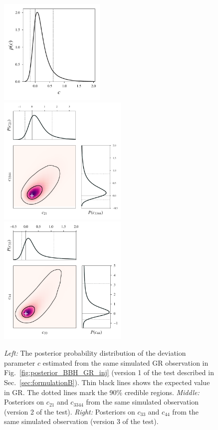 \documentclass[prd,preprintnumbers,twocolumn,eqsecnum,floatfix,a4paper,nofootinbib,superscriptaddress]{revtex4}
\begin{document}
\begin{figure}[tbh]
	\begin{center}
 		\includegraphics[height=2.0in]{figs/hist_c1_M_80_q_9_SNR_25.pdf}
		\includegraphics[height=2.45in]{figs/c2_c34_M_80_q_9_SNR_25.pdf}
		\includegraphics[height=2.45in]{figs/c3_c4_M_80_q_9_SNR_25.pdf}
	\end{center} 
 	\caption{\emph{Left:} The posterior probability distribution of the deviation parameter $c$ estimated from the same simulated GR observation in Fig.~\ref{fig:posterior_BBH_GR_inj} (version 1 of the test described in Sec.~\ref{sec:formulationB}). Thin black lines shows the expected value in GR. The dotted lines mark the 90\% credible regions. \emph{Middle:} Posteriors on $c_{21}$ and $c_{3344}$ from the same simulated observation (version 2 of the test). \emph{Right:} Posteriors on $c_{33}$ and $c_{44}$ from the same simulated observation (version 3 of the test).} 
	\label{fig:test2posts}
\end{figure}
\end{document}

